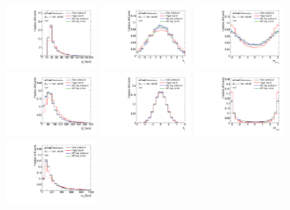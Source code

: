 \begin{figure}[h!]
  \centering
  \includegraphics[width=0.3\textwidth]{figures/hmumu/vars/Jets_PT_Sub}
  \includegraphics[width=0.3\textwidth]{figures/hmumu/vars/Jets_Eta_Sub}
  \includegraphics[width=0.3\textwidth]{figures/hmumu/vars/DeltaPhi_mumuj2} \\
  \includegraphics[width=0.3\textwidth]{figures/hmumu/vars/Jets_PT_jj}
  \includegraphics[width=0.3\textwidth]{figures/hmumu/vars/Jets_Y_jj}
  \includegraphics[width=0.3\textwidth]{figures/hmumu/vars/DeltaPhi_mumujj} \\
  \includegraphics[width=0.3\textwidth]{figures/hmumu/vars/Jets_Minv_jj}

\end{figure}
